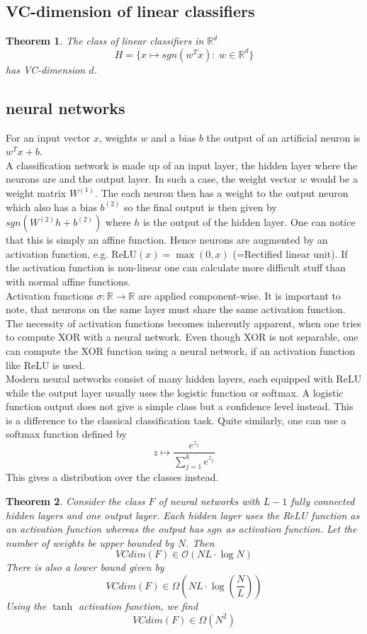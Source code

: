 \documentclass[a4paper, 12pt]{article}
\theoremstyle{plain}
\newtheorem{theorem}{Theorem}[subsection] %
\theoremstyle{definition}
\theoremstyle{lemma}
\theoremstyle{remark}
\theoremstyle{example}
\begin{document}
	\subsection{VC-dimension of linear classifiers}
	\begin{theorem}
		The class of linear classifiers in $\mathbb{R}^d$ \[H = \{x\mapsto sgn(w^Tx): \; w \in \mathbb{R}^d\}\]
		has VC-dimension $d$.
	\end{theorem}
	\subsection{neural networks}
	For an input vector $x$, weights $w$ and a bias $b$ the output of an artificial neuron is $w^Tx+b$.\\
	A classification network is made up of an input layer, the hidden layer where the neurons are and the output layer. In such a case, the weight vector $w$ would be a weight matrix $W^{(1)}$. The each neuron then has a weight to the output neuron which also has a bias $b^{(2)}$ so the final output is then given by $sgn(W^{(2)}h + b^{(2)})$ where $h$ is the output of the hidden layer. One can notice that this is simply an affine function. Hence neurons are augmented by an activation function, e.g. ReLU$(x) = \max(0,x)$ (=Rectified linear unit). If the activation function is non-linear one can calculate more difficult stuff than with normal affine functions.\\
	Activation functions $\sigma: \mathbb{R} \to \mathbb{R}$ are applied component-wise. It is important to note, that neurons on the same layer must share the same activation function. The necessity of activation functions becomes inherently apparent, when one tries to compute XOR with a neural network. Even though XOR is not separable, one can compute the XOR function using a neural network, if an activation function like ReLU is used.\\
	Modern neural networks consist of many hidden layers, each equipped with ReLU while the output layer usually uses the logistic function or softmax. A logistic function output does not give a simple class but a confidence level instead. This is a difference to the classical classification task. Quite similarly, one can use a softmax function defined by \[z \mapsto \frac{e^{z_i}}{\sum_{j=1}^k e^{z_j}}\] This gives a distribution over the classes instead.
	\begin{theorem}
		Consider the class $F$ of neural networks with $L-1$ fully connected hidden layers and one output layer. Each hidden layer uses the ReLU function as an activation function whereas the output has $sgn$ as activation function. Let the number of weights be upper bounded by $N$. Then \[VCdim(F) \in \mathcal{O}(NL\cdot \log N)\]
		There is also a lower bound given by \[ VCdim(F) \in \Omega\left(NL\cdot \log\left(\frac{N}{L}\right)\right)\] 
		Using the $\tanh$ activation function, we find \[VCdim(F) \in \Omega(N^2)\]
	\end{theorem}
\end{document}
